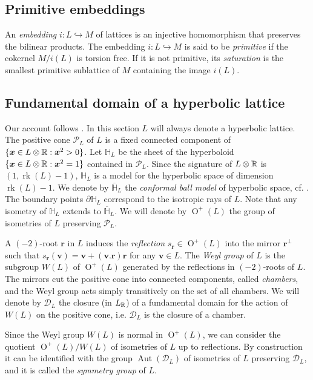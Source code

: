 \documentclass[11pt,letterpaper]{amsart}
\newcommand{\vect}[1]{\boldsymbol{#1}}
\DeclareMathOperator{\rk}{rk}
\DeclareMathOperator{\Aut}{Aut}
\DeclareMathOperator{\Or}{O}
\begin{document}
\subsection{Primitive embeddings}

An \emph{embedding} $i:L\hookrightarrow M$ of lattices is an injective homomorphism that preserves the bilinear products. The embedding $i:L\hookrightarrow M$ is said to be \emph{primitive} if the cokernel $M/i(L)$ is torsion free. If it is not primitive, its \emph{saturation} is the smallest primitive sublattice of $M$ containing the image $i(L)$.

\subsection{Fundamental domain of a hyperbolic lattice}\label{sect:fundamental domain}
Our account follows \cite[Chapter 8, \S 2]{huybrechts.K3}.
In this section $L$ will always denote a hyperbolic lattice.
The positive cone $\mathcal{P}_L$ of $L$ is a fixed connected component of $\{\vect{x}\in L\otimes \RR : \vect{x}^2>0\}$.
Let $\mathbb{H}_L$ be the sheet of the hyperboloid $\{\vect{x}\in L\otimes \RR : \vect{x}^2 = 1\}$ contained in $\mathcal{P}_L$.
Since the signature of $L\otimes \mathbb{R}$ is $(1,\rk(L)-1)$, $\mathbb{H}_L$ is a model for the hyperbolic space of dimension $\rk(L)-1$. We denote by $\overline{\mathbb{H}}_L$
the \emph{conformal ball model} of hyperbolic space, cf. \cite[§4.5]{ratcliffe}. The boundary points $\partial \mathbb{H}_L$ correspond to the isotropic rays of $L$. Note that any isometry of $\mathbb{H}_L$ extends to $\overline{\mathbb{H}}_L$.
We will denote by $\Or^+(L)$ the group of isometries of $L$ preserving $\mathcal{P}_L$.

A $(-2)$-root $\vect{r}$ in $L$ induces the \emph{reflection} $s_{\vect{r}}\in \Or^+(L)$ into the mirror $\vect{r}^\perp$ such that $s_{\vect{r}}(\vect{v})=\vect{v}+(\vect{v}.\vect{r})\vect{r}$ for any $\vect{v}\in L$. %
The \emph{Weyl group} of $L$ is the subgroup $W(L)$ of $\Or^+(L)$ generated by the reflections in $(-2)$-roots of $L$. 
 The mirrors cut the positive cone into connected components, called \emph{chambers}, and the Weyl group acts simply transitively on the set of all chambers. 
 We will denote by $\mathcal{D}_L$ the closure (in $L_{\mathbb{R}}$) of a fundamental domain for the action of $W(L)$ on the positive cone, i.e. $\mathcal{D}_L$ is the closure of a chamber.  

Since the Weyl group $W(L)$ is normal in $\Or^+(L)$, we can consider the quotient $\Or^+(L)/W(L)$ of isometries of $L$ up to reflections. By construction it can be identified with the group $\Aut(\mathcal{D}_L)$ of isometries of $L$ preserving $\mathcal{D}_L$, and it is called the \emph{symmetry group} of $L$.
\end{document}
